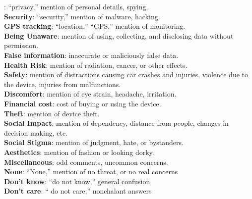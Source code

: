 : ``privacy,'' mention of personal details, spying. \\
{\bf Security}:  ``security,'' mention of malware, hacking. \\
{\bf GPS tracking}: ``location,'' ``GPS,'' mention of monitoring. \\
{\bf Being Unaware}: mention of using, collecting, and disclosing data without permission. \\
{\bf False information}: inaccurate or maliciously false data.\\
{\bf Health Risk}: mention of radiation, cancer, or other effects.\\
{\bf Safety}: mention of distractions causing car crashes and injuries, violence due to the device, injuries from malfunctions.\\
{\bf Discomfort}: mention of eye strain, headache, irritation. \\
{\bf Financial cost}: cost of buying or using the device. \\
{\bf Theft}: mention of device theft. \\
{\bf Social Impact}: mention of dependency, distance from people, changes in decision making, etc. \\
{\bf Social Stigma}: mention of judgment, hate, or bystanders.\\ 
{\bf Aesthetics}: mention of fashion or looking dorky. \\
{\bf Miscellaneous}: odd comments, uncommon concerns. \\
{\bf None}: ``None,'' mention of no threat, or no real concerns \\
{\bf Don't know}: ``do not know,'' general confusion \\
{\bf Don't care}: `` do not care,'' nonchalant answers 


